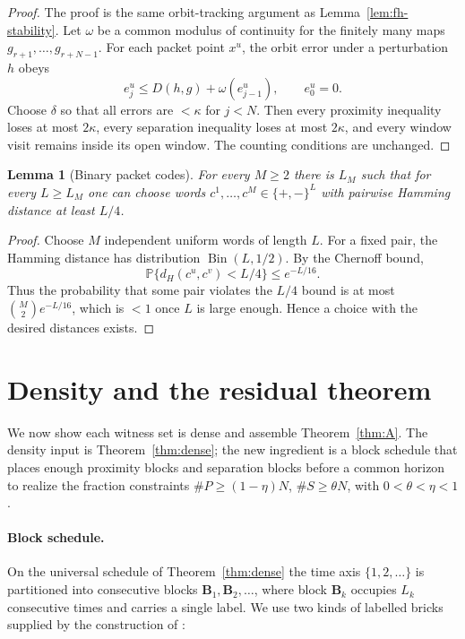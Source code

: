 \documentclass[11pt]{article}
\newtheorem{lemma}[theorem]{Lemma}
\begin{document}
\begin{proof}
The proof is the same orbit-tracking argument as
Lemma~\ref{lem:fh-stability}.  Let \(\omega\) be a common modulus of continuity
for the finitely many maps \(g_{r+1},\ldots,g_{r+N-1}\).  For each packet point
\(x^u\), the orbit error under a perturbation \(h\) obeys
\[
  e_j^u\le D(h,g)+\omega(e_{j-1}^u),\qquad e_0^u=0 .
\]
Choose \(\delta\) so that all errors are \(<\kappa\) for \(j<N\).  Then every
proximity inequality loses at most \(2\kappa\), every separation inequality
loses at most \(2\kappa\), and every window visit remains inside its open
window.  The counting conditions are unchanged.
\end{proof}

\begin{lemma}[Binary packet codes]\label{lem:packet-code}
For every \(M\ge2\) there is \(L_M\) such that for every \(L\ge L_M\) one can
choose words \(c^1,\ldots,c^M\in\{+,-\}^L\) with pairwise Hamming distance at
least \(L/4\).
\end{lemma}

\begin{proof}
Choose \(M\) independent uniform words of length \(L\).  For a fixed pair, the
Hamming distance has distribution \(\operatorname{Bin}(L,1/2)\).  By the
Chernoff bound,
\[
  \mathbb P\{d_H(c^u,c^v)<L/4\}\le e^{-L/16}.
\]
Thus the probability that some pair violates the \(L/4\) bound is at most
\(\binom M2 e^{-L/16}\), which is \(<1\) once \(L\) is large enough.  Hence a
choice with the desired distances exists.
\end{proof}

\section{Density and the residual theorem}\label{sec:density}

We now show each witness set is dense and assemble Theorem~\ref{thm:A}.  The density
input is Theorem~\ref{thm:dense}; the new ingredient is a block schedule that places
enough proximity blocks and separation blocks before a common horizon to realize the
fraction constraints \(\#P\ge(1-\eta)N\), \(\#S\ge\theta N\), with \(0<\theta<\eta<1\).

\paragraph{Block schedule.}
On the universal schedule of Theorem~\ref{thm:dense} the time axis $\{1,2,\dots\}$ is
partitioned into consecutive blocks $\mathbf B_1,\mathbf B_2,\dots$, where block
$\mathbf B_k$ occupies $L_k$ consecutive times and carries a single label.  We use two
kinds of labelled bricks supplied by the construction of \cite[\S12]{Shmalo2026}:
\end{document}
